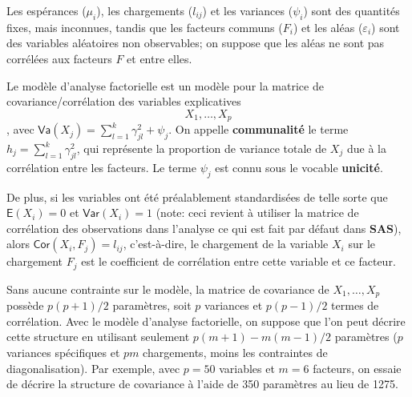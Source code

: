 \documentclass[
  11pt,
  letterpaper,
]{book}
\theoremstyle{definition}
\theoremstyle{definition}
\theoremstyle{definition}
\theoremstyle{remark}
\begin{document}
Les espérances (\(\mu_i\)), les chargements (\(l_{ij}\)) et les variances (\(\psi_i\)) sont des quantités fixes, mais inconnues, tandis que les facteurs communs (\(F_i\)) et les aléas (\(\varepsilon_i\)) sont des variables aléatoires non observables; on suppose que les aléas ne sont pas corrélées aux facteurs \(F\) et entre elles.

Le modèle d'analyse factorielle est un modèle pour la matrice de covariance/corrélation des variables explicatives \[X_1, \ldots, X_p\], avec
\(\mathsf{Va}(X_j) = \sum_{l=1}^k \gamma_{jl}^2 + \psi_j\). On appelle \textbf{communalité} le terme \(h_j = \sum_{l=1}^k \gamma_{jl}^2\), qui représente la proportion de variance totale de \(X_j\) due à la corrélation entre les facteurs. Le terme \(\psi_j\) est connu sous le vocable \textbf{unicité}.

De plus, si les variables ont été préalablement standardisées de telle sorte que \({\mathsf E}\left(X_i\right)=0\) et \({\mathsf{Var}}\left(X_i\right)=1\) (note: ceci revient à utiliser la matrice de corrélation des observations dans l'analyse ce qui est fait par défaut dans \textbf{SAS}), alors \({\mathsf{Cor}}\left(X_i, F_j\right)=l_{ij}\), c'est-à-dire, le chargement de la variable \(X_i\) sur le chargement \(F_j\) est le coefficient de corrélation entre cette variable et ce facteur.

Sans aucune contrainte sur le modèle, la matrice de covariance de \(X_1, \ldots, X_p\) possède \(p(p+1)/2\) paramètres, soit \(p\) variances et \(p(p-1)/2\) termes de corrélation. Avec le modèle d'analyse factorielle, on suppose que l'on peut décrire cette structure en utilisant seulement \(p(m+1) - m(m-1)/2\) paramètres (\(p\) variances spécifiques et \(pm\) chargements, moins les contraintes de diagonalisation). Par exemple, avec \(p=50\) variables et \(m=6\) facteurs, on essaie de décrire la structure de covariance à l'aide de 350 paramètres au lieu de 1275.
\end{document}
